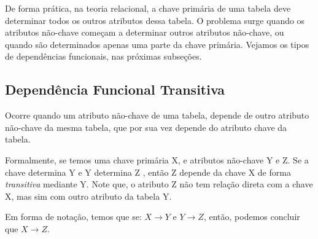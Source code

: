 De forma prática, na teoria relacional, a chave primária de uma tabela deve determinar todos os outros atributos dessa tabela. O problema surge quando os atributos não-chave começam a determinar outros atributos não-chave, ou quando são determinados apenas uma parte da chave primária. Vejamos os tipos de dependências funcionais, nas próximas subseções.

\subsection{Dependência Funcional Transitiva}
Ocorre quando um atributo não-chave de uma tabela, depende de outro atributo não-chave da mesma tabela, que por sua vez depende do atributo chave da tabela.\cite{angelotti2010banco} 

Formalmente, se temos uma chave primária X, e atributos não-chave Y e Z. Se a chave determina Y  e Y determina Z , então Z depende da chave X de forma \textit{transitiva} mediante Y. Note que, o atributo Z não tem relação direta com a chave X, mas sim com outro atributo da tabela Y.\cite{date2003introducao}

Em forma de notação, temos que se: $X \rightarrow Y$ e $Y \rightarrow Z$, então, podemos concluir que $X \rightarrow Z$.

